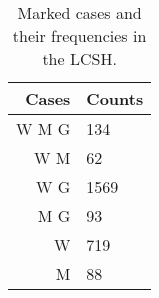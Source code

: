 \begin{table}
	\caption{Marked cases and their frequencies in the LCSH.}
	\begin{center}
		\begin{tabular}{rl}
			\toprule
			\textbf{Cases} & \textbf{Counts} \\
			\midrule
			W {\textbar} M {\textbar} G & 134 \\
			W {\textbar} M & 62 \\
			W {\textbar} G & 1569 \\
			M {\textbar} G & 93 \\
			W & 719 \\
			M & 88 \\
			\bottomrule
		\end{tabular}
	\end{center}
	\label{tab:markedness}
\end{table}